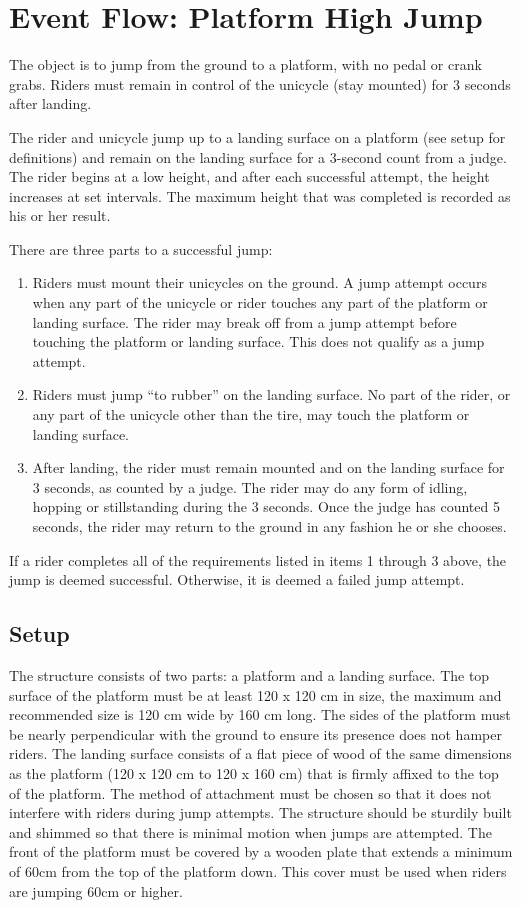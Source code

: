 \section{Event Flow: Platform High Jump}
The object is to jump from the ground to a platform, with no pedal or crank grabs.
Riders must remain in control of the unicycle (stay mounted) for 3 seconds after landing.

The rider and unicycle jump up to a landing surface on a platform (see setup for definitions) and remain on the landing surface for a 3-second count from a judge.
The rider begins at a low height, and after each successful attempt, the height increases at set intervals.
The maximum height that was completed is recorded as his or her result.

There are three parts to a successful jump:
\begin{enumerate}
\item Riders must mount their unicycles on the ground.
A jump attempt occurs when any part of the unicycle or rider touches any part of the platform or landing surface.
The rider may break off from a jump attempt before touching the platform or landing surface.
This does not qualify as a jump attempt.
\item Riders must jump ``to rubber'' on the landing surface.
No part of the rider, or any part of the unicycle other than the tire, may touch the platform or landing surface.
\item After landing, the rider must remain mounted and on the landing surface for 3 seconds, as counted by a judge.
The rider may do any form of idling, hopping or stillstanding during the 3 seconds.
Once the judge has counted 5 seconds, the rider may return to the ground in any fashion he or she chooses.
\end{enumerate}
If a rider completes all of the requirements listed in items 1 through 3 above, the jump is deemed successful.
Otherwise, it is deemed a failed jump attempt.

\subsection{Setup}
The structure consists of two parts: a platform and a landing surface.
The top surface of the platform must be at least 120 x 120 cm in size, the maximum and recommended size is 120 cm wide by 160 cm long.
The sides of the platform must be nearly perpendicular with the ground to ensure its presence does not hamper riders.
The landing surface consists of a flat piece of wood of the same dimensions as the platform (120 x 120 cm to 120 x 160 cm) that is firmly affixed to the top of the platform.
The method of attachment must be chosen so that it does not interfere with riders during jump attempts.
The structure should be sturdily built and shimmed so that there is minimal motion when jumps are attempted.
The front of the platform must be covered by a wooden plate that extends a minimum of 60cm from the top of the platform down.
This cover must be used when riders are jumping 60cm or higher.

